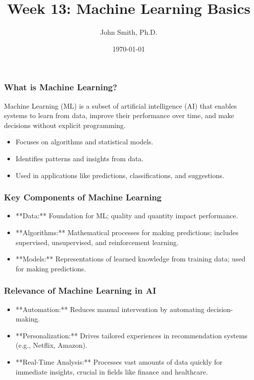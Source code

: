 \documentclass[aspectratio=169]{beamer}
\title[Machine Learning Basics]{Week 13: Machine Learning Basics}
\author[J. Smith]{John Smith, Ph.D.}
\institute[University Name]{
  Department of Computer Science\\
  University Name\\
  \vspace{0.3cm}
  Email: email@university.edu\\
  Website: www.university.edu
}
\date{\today}
\begin{document}
\frame{\titlepage}

\begin{frame}[fragile]
    \titlepage
\end{frame}

\begin{frame}[fragile]
    \frametitle{What is Machine Learning?}
    Machine Learning (ML) is a subset of artificial intelligence (AI) that enables systems to learn from data, improve their performance over time, and make decisions without explicit programming. 

    \begin{itemize}
        \item Focuses on algorithms and statistical models.
        \item Identifies patterns and insights from data.
        \item Used in applications like predictions, classifications, and suggestions.
    \end{itemize}
\end{frame}

\begin{frame}[fragile]
    \frametitle{Key Components of Machine Learning}
    
    \begin{itemize}
        \item **Data:** Foundation for ML; quality and quantity impact performance.
        \item **Algorithms:** Mathematical processes for making predictions; includes supervised, unsupervised, and reinforcement learning.
        \item **Models:** Representations of learned knowledge from training data; used for making predictions.
    \end{itemize}
\end{frame}

\begin{frame}[fragile]
    \frametitle{Relevance of Machine Learning in AI}
    
    \begin{itemize}
        \item **Automation:** Reduces manual intervention by automating decision-making.
        \item **Personalization:** Drives tailored experiences in recommendation systems (e.g., Netflix, Amazon).
        \item **Real-Time Analysis:** Processes vast amounts of data quickly for immediate insights, crucial in fields like finance and healthcare.
    \end{itemize}
\end{frame}
\end{document}
